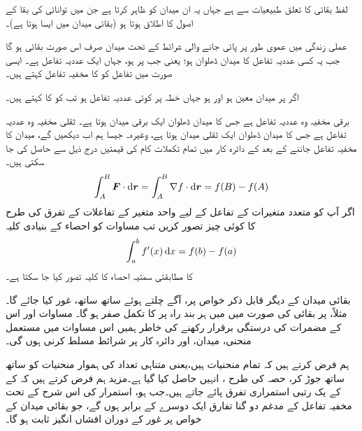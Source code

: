 لفظ بقائی کا تعلق طبیعیات  سے ہے جہاں  یہ  ان میدان کو ظاہر کرتا ہے جن میں توانائی کی بقا کے اصول   کا اطلاق ہوتا ہو (بقائی میدان میں ایسا ہوتا ہے)۔

عملی زندگی میں   عموی  طور پر پائی جانے   والی شرائط   کے تحت میدان  صرف  اس صورت بقائی ہو گا جب یہ کسی عددیہ تفاعل  کا میدان  ڈھلوان ہو؛ یعنی جب 
   پر  ہو،  جہاں  ایک عددیہ تفاعل ہے۔ ایسی صورت میں تفاعل  کو  کا مخفیہ تفاعل کہتے ہیں۔   

اگر پر میدان  معین ہو اور  ہو جہاں  خطہ  پر کوئی  عددیہ تفاعل ہو تب  کو  کا  کہتے ہیں۔

برقی مخفیہ  وہ  عددیہ تفاعل ہے جس کا میدان ڈھلوان  ایک برقی میدان ہوتا ہے۔  ثقلی مخفیہ وہ  عددیہ تفاعل ہے جس کا میدان ڈھلوان ایک  ثقلی میدان ہوتا ہے، وغیرہ۔ جیسا ہم اب دیکھیں گے،  میدان  کا مخفیہ تفاعل  جاننے کے بعد  کے  دائرہ کار میں تمام تکملات کام  کی قیمتیں درج ذیل سے حاصل کی جا سکتی ہیں۔
\begin{align}\label{مساوات_سمتی_تکمل_مخفی_قوہ_استعمال}
\int_A^B\kvec{F}\cdot\dif\kvec{r}=\int_A^B\nabla f\cdot\dif \kvec{r}=f(B)-f(A)
\end{align}
اگر آپ    کو متعدد متغیرات کے تفاعل کے لیے   واحد متغیر کے تفاعلات  کے تفرق  کی طرح   کا کوئی  چیز تصور کریں  تب مساوات  کو احصاء کے بنیادی کلیہ
\begin{align*}
\int_a^bf'(x)\dif x=f(b)-f(a)
\end{align*}  
کا مطابقتی سمتیہ احصاء کا کلیہ تصور کیا جا سکتا ہے۔

بقائی میدان کے  دیگر قابل ذکر خواص پر، آگے چلتے ہوئے ساتھ ساتھ، غور کیا جائے گا۔ مثلاً،  پر بقائی  کی صورت میں  میں ہر بند راہ پر  کا  تکمل  صفر ہو گا۔ مساوات   اور اس کے  مضمرات کی درستگی برقرار رکھنے  کی خاطر ہمیں اس مساوات میں مستعمل منحنی، میدان، اور دائرہ کار پر شرائط مسلط کرنی ہوں گی۔

ہم فرض کرتے ہیں کہ تمام منحنیات  ہیں،یعنی  متناہی تعداد کی ہموار  منحنیات کو  ساتھ ساتھ جوڑ کر، حصہ  کی طرح ، انہیں حاصل کیا گیا ہے۔مزید ہم فرض کرتے ہیں کہ  کے   کے یک رتبی استمراری تفرق   پائے جاتے ہیں۔جب   ہو، استمرار کی   اس  شرح  کے   تحت مخفیہ تفاعل  کے مدغم دو گنا  تفارق   ایک دوسرے کے برابر ہوں گے، جو بقائی میدان  کے خواص پر غور کے دوران افشاں انگیز ثابت ہو گا۔


